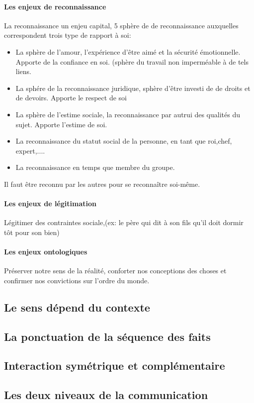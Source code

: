 \documentclass[11pt]{article} %
\begin{document}
		\paragraph{Les enjeux de reconnaissance}
		La reconnaissance un enjeu capital, 5 sphère de de reconnaissance auxquelles correspondent trois
		type de rapport à soi:
		\begin{itemize}
			\item La sphère de l'amour, l'expérience d'être aimé et la sécurité émotionnelle. Apporte de la 
			confiance en soi. (sphère du travail non imperméable à de tels liens.
			\item La sphére de la reconnaissance juridique, sphère d'être investi de de droits et de devoirs. 
			Apporte le respect de soi
			\item La sphère de l'estime sociale, la reconnaissance par autrui des qualités du sujet. Apporte
			l'estime de soi.
			\item La reconnaissance du statut social de la personne, en tant que roi,chef, expert,....
			\item La reconnaissance en temps que membre du groupe.
		\end{itemize}
		Il faut être reconnu par les autres pour se reconnaître soi-même.
		\paragraph{Les enjeux de légitimation} Légitimer des contraintes sociale,(ex: le père qui dit à son fils
		qu'il doit dormir tôt pour son bien)
		\paragraph{Les enjeux ontologiques} Préserver notre sens de la réalité, conforter nos conceptions des 
		choses et confirmer nos convictions sur l'ordre du monde.
	\subsection{Le sens dépend du contexte}
	\subsection{La ponctuation de la séquence des faits}
	\subsection{Interaction symétrique et complémentaire}
	\subsection{Les deux niveaux de la communication}
\end{document}
